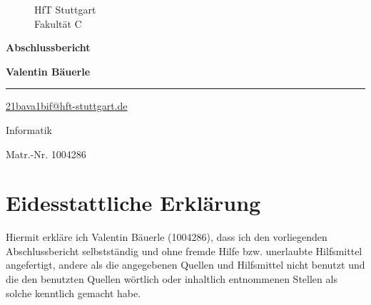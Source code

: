 \documentclass[12pt]{article}
\begin{document}
\begin{titlepage}

  \setcounter{page}{-1}

	\begin{figure}[h]
		\begin{minipage}[b]{12 cm}
			{\sffamily
				{\Large HfT Stuttgart } \\
				Fakultät  C
			}
		\end{minipage}
	\end{figure}

	\vfill
	
	\begin{center}
		\vspace{14mm}
		\noindent \textbf{\huge
		  Abschlussbericht\\
		}
		\vspace{20mm}	
	\end{center}
	
	\vfill
	
\noindent\textbf{Valentin Bäuerle}

\noindent\rule{\textwidth}{0.4mm}

\noindent\href{mailto:21bava1bif@hft-stuttgart.de}{21bava1bif@hft-stuttgart.de}

\noindent Informatik

\noindent Matr.-Nr. 1004286

\end{titlepage}

\newpage
\section*{Eidesstattliche Erklärung}
Hiermit erkläre ich Valentin Bäuerle (1004286), dass ich den vorliegenden Abschlussbericht selbstständig und ohne fremde Hilfe bzw. unerlaubte Hilfsmittel angefertigt, andere als die angegebenen Quellen und Hilfsmittel nicht benutzt und die den benutzten Quellen wörtlich oder inhaltlich entnommenen Stellen als solche kenntlich gemacht habe.
\end{document}
